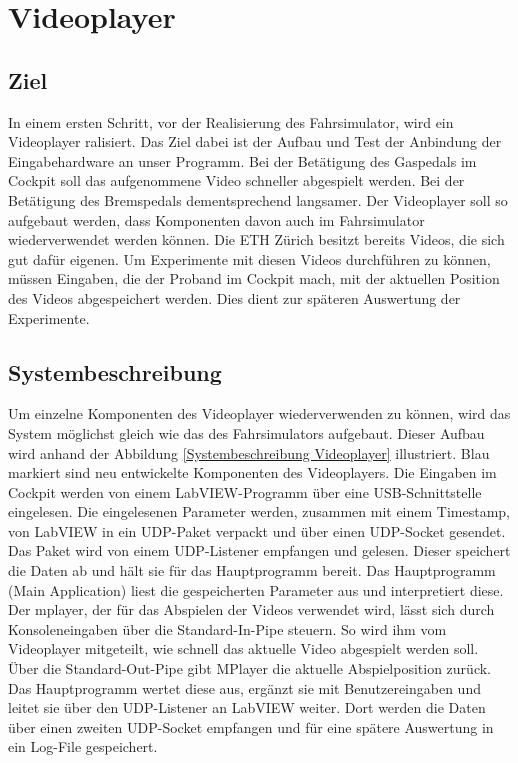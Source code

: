 \section{Videoplayer}
\label{sec:videoplayer}

\subsection{Ziel}
In einem ersten Schritt, vor der Realisierung des Fahrsimulator, wird ein Videoplayer ralisiert. Das Ziel dabei ist der Aufbau und Test der Anbindung der Eingabehardware an unser Programm. Bei der Betätigung des Gaspedals im Cockpit soll das aufgenommene Video schneller abgespielt werden. Bei der Betätigung des Bremspedals dementsprechend langsamer. Der Videoplayer soll so aufgebaut werden, dass Komponenten davon auch im Fahrsimulator wiederverwendet werden können. Die ETH Zürich besitzt bereits Videos, die sich gut dafür eigenen. Um Experimente mit diesen Videos durchführen zu können, müssen Eingaben, die der Proband im Cockpit mach, mit der aktuellen Position des Videos abgespeichert werden. Dies dient zur späteren Auswertung der Experimente.
\\
\subsection{Systembeschreibung}

Um einzelne Komponenten des Videoplayer wiederverwenden zu können, wird das System möglichst gleich wie das des Fahrsimulators aufgebaut. Dieser Aufbau wird anhand der Abbildung \ref{Systembeschreibung Videoplayer} illustriert. Blau markiert sind neu entwickelte Komponenten des Videoplayers. Die Eingaben im Cockpit werden von einem LabVIEW-Programm über eine USB-Schnittstelle eingelesen. Die eingelesenen Parameter werden, zusammen mit einem Timestamp, von LabVIEW in ein UDP-Paket verpackt und über einen UDP-Socket gesendet. Das Paket wird von einem UDP-Listener empfangen und gelesen. Dieser speichert die Daten ab und hält sie für das Hauptprogramm bereit. Das Hauptprogramm (Main Application) liest die gespeicherten Parameter aus und interpretiert diese. Der \gls{mplayer}, der für das Abspielen der Videos verwendet wird, lässt sich durch Konsoleneingaben über die Standard-In-Pipe steuern. So wird ihm vom Videoplayer mitgeteilt, wie schnell das aktuelle Video abgespielt werden soll.  Über die Standard-Out-Pipe gibt MPlayer die aktuelle Abspielposition zurück. Das Hauptprogramm wertet diese aus, ergänzt sie mit Benutzereingaben und leitet sie über den UDP-Listener an LabVIEW weiter. Dort werden die Daten über  einen zweiten UDP-Socket empfangen und für eine spätere Auswertung in ein Log-File gespeichert.
\newpage

